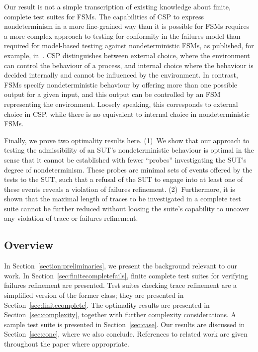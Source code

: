 Our result is not a simple transcription of existing knowledge about finite,
complete test suites for FSMs. The capabilities of CSP to express
nondeterminism in a more fine-grained way than it is possible for FSMs
requires a more complex approach to testing for conformity in the failures
model than required for model-based testing against nondeterministic FSMs, as
published, for example,
in~\cite{hierons_testing_2004,DBLP:conf/hase/PetrenkoY14}. CSP distinguishes
between external choice, where the environment can control the behaviour of a
process, and internal choice where the behaviour is decided internally and
cannot be influenced by the environment. In contrast, FSMs specify
nondeterministic behaviour by offering more than one possible output for a
given input, and this output can be controlled by an FSM representing the
environment. Loosely speaking, this corresponds to external choice in CSP,
while there is no equivalent to internal choice in nondeterministic FSMs.


Finally, we prove two optimality results here. (1)~We show that our approach
to testing the admissibility of an SUT's nondeterministic behaviour is
optimal in the sense that it cannot be established with fewer ``probes''
investigating the SUT's degree of nondeterminism. These probes are minimal
sets of events offered by the tests to the SUT, such that a refusal of the
SUT to engage into at least one of these events reveals a violation of
failures refinement. (2)~Furthermore, it is shown that the maximal length of
traces to be investigated in a complete test suite cannot be further reduced
without loosing the suite's capability to uncover any violation of trace or
failures refinement.


\subsection{Overview}
In Section~\ref{section:preliminaries}, we present the background
relevant to our work. In Section~\ref{sec:finitecompletefails}, finite
complete test suites for verifying failures refinement are presented. Test
suites checking trace refinement are a simplified version of the former
class; they are presented in Section~\ref{sec:finitecomplete}.
The optimality results are presented in Section~\ref{sec:complexity}, together with further
complexity considerations.
A sample test
suite is presented in Section~\ref{sec:case}. Our results are discussed in
Section~\ref{sec:conc}, where we also conclude. References to related work
are given throughout the paper where appropriate.

